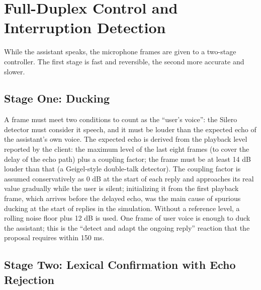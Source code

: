 \section{Full-Duplex Control and Interruption Detection}
\label{sec:bargein}

While the assistant speaks, the microphone frames are given to a two-stage controller.
The first stage is fast and reversible, the second more accurate and slower.

\subsection{Stage One: Ducking}

A frame must meet two conditions to count as the ``user's voice'': the Silero detector
must consider it speech, and it must be louder than the expected echo of the
assistant's own voice. The expected echo is derived from the playback level reported by
the client: the maximum level of the last eight frames (to cover the delay of the echo
path) plus a coupling factor; the frame must be at least 14 dB louder than that (a
Geigel-style double-talk detector). The coupling factor is assumed conservatively as
0 dB at the start of each reply and approaches its real value gradually while the user
is silent; initializing it from the first playback frame, which arrives before the
delayed echo, was the main cause of spurious ducking at the start of replies in the
simulation. Without a reference level, a rolling noise floor plus 12 dB is used. One
frame of user voice is enough to duck the assistant; this is the ``detect and adapt the
ongoing reply'' reaction that the proposal requires within 150 ms.

\subsection{Stage Two: Lexical Confirmation with Echo Rejection}

